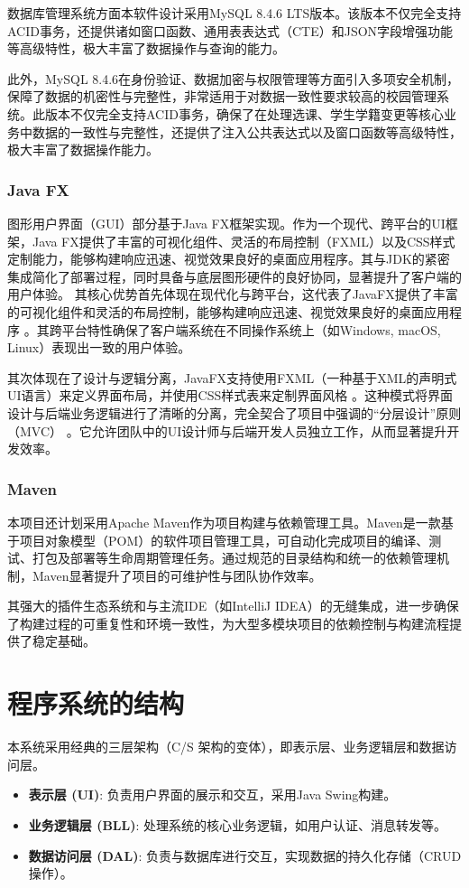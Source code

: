 \documentclass[a4paper]{ctexart}
\begin{document}
数据库管理系统方面本软件设计采用MySQL 8.4.6 LTS版本。该版本不仅完全支持ACID事务，还提供诸如窗口函数、通用表表达式（CTE）和JSON字段增强功能等高级特性，极大丰富了数据操作与查询的能力。

此外，MySQL 8.4.6在身份验证、数据加密与权限管理等方面引入多项安全机制，保障了数据的机密性与完整性，非常适用于对数据一致性要求较高的校园管理系统。此版本不仅完全支持ACID事务，确保了在处理选课、学生学籍变更等核心业务中数据的一致性与完整性，还提供了注入公共表达式以及窗口函数等高级特性，极大丰富了数据操作能力。

\subsubsection{Java FX}

图形用户界面（GUI）部分基于Java FX框架实现。作为一个现代、跨平台的UI框架，Java FX提供了丰富的可视化组件、灵活的布局控制（FXML）以及CSS样式定制能力，能够构建响应迅速、视觉效果良好的桌面应用程序。其与JDK的紧密集成简化了部署过程，同时具备与底层图形硬件的良好协同，显著提升了客户端的用户体验。
其核心优势首先体现在现代化与跨平台，这代表了JavaFX提供了丰富的可视化组件和灵活的布局控制，能够构建响应迅速、视觉效果良好的桌面应用程序 。其跨平台特性确保了客户端系统在不同操作系统上（如Windows, macOS, Linux）表现出一致的用户体验。

其次体现在了设计与逻辑分离，JavaFX支持使用FXML（一种基于XML的声明式UI语言）来定义界面布局，并使用CSS样式表来定制界面风格 。这种模式将界面设计与后端业务逻辑进行了清晰的分离，完全契合了项目中强调的“分层设计”原则（MVC） 。它允许团队中的UI设计师与后端开发人员独立工作，从而显著提升开发效率。

\subsubsection{Maven}

本项目还计划采用Apache Maven作为项目构建与依赖管理工具。Maven是一款基于项目对象模型（POM）的软件项目管理工具，可自动化完成项目的编译、测试、打包及部署等生命周期管理任务。通过规范的目录结构和统一的依赖管理机制，Maven显著提升了项目的可维护性与团队协作效率。

其强大的插件生态系统和与主流IDE（如IntelliJ IDEA）的无缝集成，进一步确保了构建过程的可重复性和环境一致性，为大型多模块项目的依赖控制与构建流程提供了稳定基础。

\section{程序系统的结构}
本系统采用经典的三层架构（C/S 架构的变体），即表示层、业务逻辑层和数据访问层。
\begin{itemize}
    \item \textbf{表示层 (UI)}: 负责用户界面的展示和交互，采用Java Swing构建。
    \item \textbf{业务逻辑层 (BLL)}: 处理系统的核心业务逻辑，如用户认证、消息转发等。
    \item \textbf{数据访问层 (DAL)}: 负责与数据库进行交互，实现数据的持久化存储（CRUD操作）。
\end{itemize}
\end{document}

